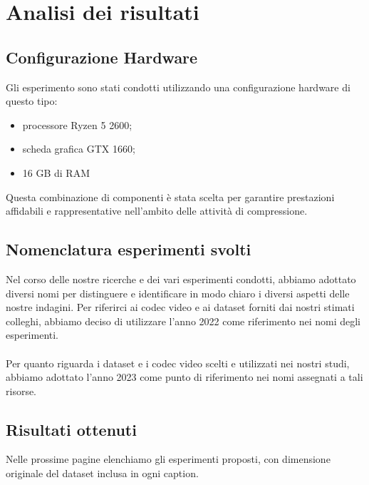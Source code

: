 \chapter{Analisi dei risultati}
\section{Configurazione Hardware}
Gli esperimento sono stati condotti utilizzando una configurazione hardware di questo tipo:
\begin{itemize}
    \item processore Ryzen 5 2600;
    \item scheda grafica GTX 1660;
    \item  16 GB di RAM
\end{itemize}
Questa combinazione di componenti è stata scelta per garantire prestazioni affidabili e rappresentative nell'ambito delle attività di compressione.

\section{Nomenclatura esperimenti svolti}
Nel corso delle nostre ricerche e dei vari esperimenti condotti, abbiamo adottato diversi nomi per distinguere e identificare in modo chiaro i diversi aspetti delle nostre indagini. Per riferirci ai codec video e ai dataset forniti dai nostri stimati colleghi, abbiamo deciso di utilizzare l'anno 2022 come riferimento nei nomi degli esperimenti. 
\\
\\
Per quanto riguarda i dataset e i codec video scelti e utilizzati nei nostri studi, abbiamo adottato l'anno 2023 come punto di riferimento nei nomi assegnati a tali risorse. 
\clearpage
\section{Risultati ottenuti}
Nelle prossime pagine elenchiamo gli esperimenti proposti, con dimensione originale del dataset inclusa in ogni caption.

